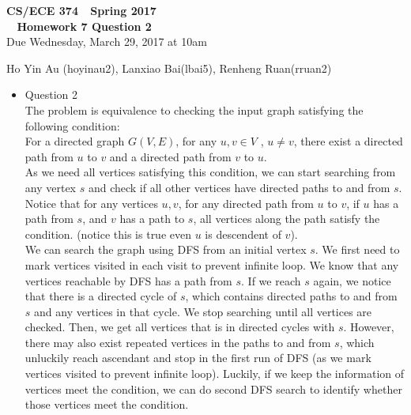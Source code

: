 \documentclass[11pt]{article}
\begin{document}
\begin{center}
\Large\textbf{CS/ECE 374 \,\decosix\,  Spring 2017}%
\\
\LARGE\textbf{\decothreeleft~ Homework 7 Question 2 ~\decothreeright}%
\\[0.5ex]
\large Due Wednesday, March 29, 2017 at 10am
\end{center}

\begin{center}


\begin{Large}
Ho Yin Au (hoyinau2), Lanxiao Bai(lbai5), Renheng Ruan(rruan2)
\end{Large}
\end{center}

\begin{itemize}
	\item	Question 2\\
	 	The problem is equivalence to checking the input graph satisfying the following condition:\\
	 	For a directed graph $G (V,E)$, for any $u,v \in V$ , $u \neq v$, there exist a directed path from $u$ to $v$ and a directed path from $v$ to $u$.\\
	 	As we need all vertices satisfying this condition, we can start searching from any vertex $s$ and check if all other vertices have directed paths to and from $s$.\\
	 	Notice that for any vertices $u,v$, for any directed path from $u$ to $v$, if $u$ has a path from $s$, and $v$ has a path to $s$, all vertices along the path satisfy the condition. (notice this is true even $u$ is descendent of $v$).\\
	 	We can search the graph using DFS from an initial vertex $s$. We first need to mark vertices visited in each visit to prevent infinite loop. We know that any vertices reachable by DFS has a path from $s$. If we reach $s$ again, we notice that there is a directed cycle of $s$, which contains directed paths to and from $s$ and any vertices in that cycle. We stop searching until all vertices are checked. Then, we get all vertices that is in directed cycles with $s$. However, there may also exist repeated vertices in the paths to and from $s$, which unluckily reach ascendant and stop in the first run of DFS (as we mark vertices visited to prevent infinite loop). Luckily, if we keep the information of vertices meet the condition, we can do second DFS search to identify whether those vertices meet the condition.\\

\end{itemize}
\end{document}
